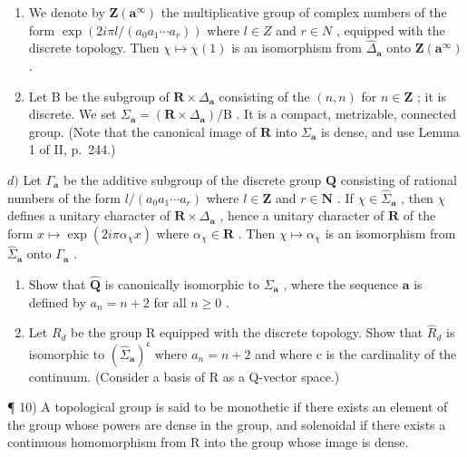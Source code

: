 \begin{enumerate}
\def\labelenumi{\alph{enumi})}
\setcounter{enumi}{1}
\item
  We denote by \(\mathbf{Z}(\boldsymbol{a}^{\infty})\) the multiplicative group of complex numbers of the form \(\exp(2i\pi l/(a_{0}a_{1}\cdots a_{r}))\) where \(l \in Z\) and \(r \in N\) , equipped with the discrete topology. Then \(\chi \mapsto \chi(1)\) is an isomorphism from \(\widehat{\Delta}_{\boldsymbol{a}}\) onto \(\mathbf{Z}(\boldsymbol{a}^{\infty})\) .
\item
  Let B be the subgroup of \(\mathbf{R} \times \Delta_{\boldsymbol{a}}\) consisting of the \((n, n)\) for \(n \in \mathbf{Z}\) ; it is discrete. We set \(\Sigma_{\boldsymbol{a}} = (\mathbf{R} \times \Delta_{\boldsymbol{a}})/\mathrm{B}\) . It is a compact, metrizable, connected group. (Note that the canonical image of \(\mathbf{R}\) into \(\Sigma_{\boldsymbol{a}}\) is dense, and use Lemma 1 of II, p.~244.)
\end{enumerate}

\(d)\) Let \(\Gamma_{\boldsymbol{a}}\) be the additive subgroup of the discrete group \(\mathbf{Q}\) consisting of rational numbers of the form \(l/(a_{0}a_{1}\cdots a_{r})\) where \(l\in\mathbf{Z}\) and \(r\in\mathbf{N}\) . If \(\chi\in\widehat{\Sigma}_{\boldsymbol{a}}\) , then \(\chi\) defines a unitary character of \(\mathbf{R}\times\Delta_{\boldsymbol{a}}\) , hence a unitary character of \(\mathbf{R}\) of the form \(x\mapsto\exp(2i\pi\alpha_{\chi}x)\) where \(\alpha_{\chi}\in\mathbf{R}\) . Then \(\chi\mapsto\alpha_{\chi}\) is an isomorphism from \(\widehat{\Sigma}_{\boldsymbol{a}}\) onto \(\Gamma_{\boldsymbol{a}}\) .

\begin{enumerate}
\def\labelenumi{\alph{enumi})}
\setcounter{enumi}{4}
\item
  Show that \(\widehat{\mathbf{Q}}\) is canonically isomorphic to \(\Sigma_{\pmb{a}}\) , where the sequence \(\pmb{a}\) is defined by \(a_{n} = n + 2\) for all \(n \geqslant 0\) .
\item
  Let \(R_{d}\) be the group R equipped with the discrete topology. Show that \(\widehat{R}_{d}\) is isomorphic to \((\widehat{\Sigma}_{\boldsymbol{a}})^{\mathfrak{c}}\) where \(a_{n}=n+2\) and where c is the cardinality of the continuum. (Consider a basis of R as a Q-vector space.)
\end{enumerate}

¶ 10) A topological group is said to be monothetic if there exists an element of the group whose powers are dense in the group, and solenoidal if there exists a continuous homomorphism from R into the group whose image is dense.

